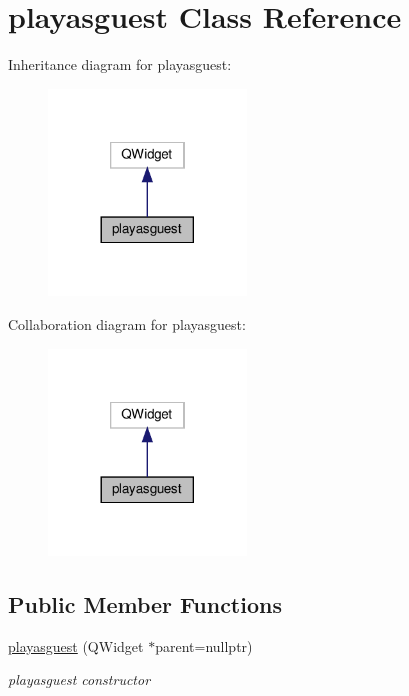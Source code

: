 \hypertarget{classplayasguest}{}\section{playasguest Class Reference}
\label{classplayasguest}


Inheritance diagram for playasguest\+:
\nopagebreak
\begin{figure}[H]
\begin{center}
\leavevmode
\includegraphics[width=149pt]{classplayasguest__inherit__graph}
\end{center}
\end{figure}


Collaboration diagram for playasguest\+:
\nopagebreak
\begin{figure}[H]
\begin{center}
\leavevmode
\includegraphics[width=149pt]{classplayasguest__coll__graph}
\end{center}
\end{figure}
\subsection*{Public Member Functions}
\begin{DoxyCompactItemize}
\item 
\hyperlink{classplayasguest_ad5c1931e8115567e7f11452e88b73d06}{playasguest} (Q\+Widget $\ast$parent=nullptr)
\begin{DoxyCompactList}\small\item\em playasguest constructor \end{DoxyCompactList}\end{DoxyCompactItemize}


